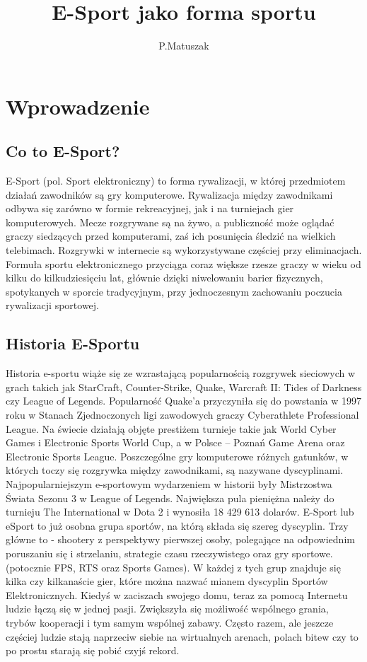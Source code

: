 \documentclass{article}
\author{P.Matuszak}
\title{E-Sport jako forma sportu}
\begin{document}
\tableofcontents
\listoffigures
\maketitle
\section{Wprowadzenie}
\subsection{Co to E-Sport?}
E-Sport (pol. Sport elektroniczny) to forma rywalizacji, w której przedmiotem działań zawodników są gry komputerowe. Rywalizacja między zawodnikami odbywa się zarówno w formie rekreacyjnej, jak i na turniejach gier komputerowych. Mecze rozgrywane są na żywo, a publiczność może oglądać graczy siedzących przed komputerami, zaś ich posunięcia śledzić na wielkich telebimach. Rozgrywki w internecie są wykorzystywane częściej przy eliminacjach. Formuła sportu elektronicznego przyciąga coraz większe rzesze graczy w wieku od kilku do kilkudziesięciu lat, głównie dzięki niwelowaniu barier fizycznych, spotykanych w sporcie tradycyjnym, przy jednoczesnym zachowaniu poczucia rywalizacji sportowej.
\subsection{Historia E-Sportu}
Historia e-sportu wiąże się ze wzrastającą popularnością rozgrywek sieciowych w grach takich jak StarCraft, Counter-Strike, Quake, Warcraft II: Tides of Darkness czy League of Legends. Popularność Quake'a przyczyniła się do powstania w 1997 roku w Stanach Zjednoczonych ligi zawodowych graczy Cyberathlete Professional League. Na świecie działają objęte prestiżem turnieje takie jak World Cyber Games i Electronic Sports World Cup, a w Polsce – Poznań Game Arena oraz Electronic Sports League. Poszczególne gry komputerowe różnych gatunków, w których toczy się rozgrywka między zawodnikami, są nazywane dyscyplinami. Najpopularniejszym e-sportowym wydarzeniem w historii były Mistrzostwa Świata Sezonu 3 w League of Legends. Największa pula pieniężna należy do turnieju The International w Dota 2 i wynosiła 18 429 613 dolarów. E-Sport lub eSport to już osobna grupa sportów, na którą składa się szereg dyscyplin. Trzy główne to - shootery z perspektywy pierwszej osoby, polegające na odpowiednim poruszaniu się i strzelaniu, strategie czasu rzeczywistego oraz gry sportowe. (potocznie FPS, RTS oraz Sports Games). W każdej z tych grup znajduje się kilka czy kilkanaście gier, które można nazwać mianem dyscyplin Sportów Elektronicznych. Kiedyś w zaciszach swojego domu, teraz za pomocą Internetu ludzie łączą się w jednej pasji. Zwiększyła się możliwość wspólnego grania, trybów kooperacji i tym samym wspólnej zabawy. Często razem, ale jeszcze częściej ludzie stają naprzeciw siebie na wirtualnych arenach, polach bitew czy to po prostu starają się pobić czyjś rekord.
\end{document}
